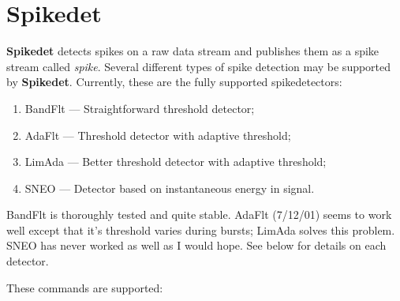 \documentclass[12pt,oneside]{book}
\def\prog#1{{\bf #1}}
\def\stream#1{{\it #1}\xspace}
\def\streamtype#1{{\sc #1}\xspace}
\def\raw{\streamtype{raw}}
\def\spike{\streamtype{spike}}
\begin{document}
\section{Spikedet}\label{ss:spikedet}

\prog{Spikedet} detects spikes on a \raw data stream and publishes
them as a \spike stream called \stream{spike}. Several different types
of spike detection may be supported by \prog{Spikedet}. 
Currently, these are the fully supported spikedetectors:
\begin{enumerate}
\item{BandFlt} --- Straightforward threshold detector;
\item{AdaFlt} --- Threshold detector with adaptive threshold;
\item{LimAda} --- Better threshold detector with adaptive threshold;
\item{SNEO} --- Detector based on instantaneous energy in signal.
\end{enumerate}

\noindent BandFlt is thoroughly tested and quite stable. AdaFlt 
(7/12/01) seems to work well except that it's threshold varies during
bursts; LimAda solves this problem. SNEO has never worked as well as I
would hope. See below for details on each detector.

These commands are supported:
\end{document}
